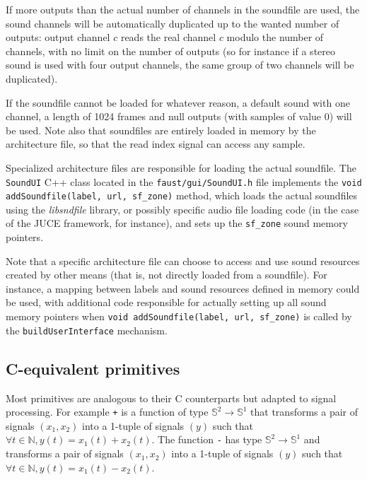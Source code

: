 If more outputs than the actual number of channels in the soundfile are used, the sound channels will be automatically duplicated up to the wanted number of outputs: output channel $c$ reads the real channel $c$ modulo the number of channels, with no limit on the number of outputs (so for instance if a stereo sound is used with four output channels, the same group of two channels will be duplicated).

If the soundfile cannot be loaded for whatever reason, a default sound with one channel, a length of 1024 frames and null outputs (with samples of value 0) will be used. Note also that soundfiles are entirely loaded in memory by the architecture file, so that the read index signal can access any sample.

Specialized architecture files are responsible for loading the actual soundfile. The \lstinline'SoundUI' C++ class located in the \lstinline'faust/gui/SoundUI.h' file implements the \lstinline'void addSoundfile(label, url, sf_zone)' method, which loads the actual soundfiles using the {\it libsndfile} library, or possibly specific audio file loading code (in the case of the JUCE framework, for instance), and sets up the \lstinline'sf_zone' sound memory pointers.

Note that a specific architecture file can choose to access and use sound resources created by other means (that is, not directly loaded from a soundfile). For instance, a mapping between labels and sound resources defined in memory could be used, with additional code responsible for actually setting up all sound memory pointers when \lstinline'void addSoundfile(label, url, sf_zone)' is called by the \lstinline'buildUserInterface' mechanism.

\subsection{C-equivalent primitives}

Most \faust primitives are analogous to their C counterparts but adapted to signal processing.
For example \lstinline|+| is a function of type $\mathbb{S}^{2}\rightarrow\mathbb{S}^{1}$ that transforms a pair of signals $(x_1,x_2)$ into a 1-tuple of signals $(y)$ such that $\forall t\in\mathbb{N}, y(t)=x_{1}(t)+x_{2}(t)$. The function \lstinline|-| has type $\mathbb{S}^{2}\rightarrow\mathbb{S}^{1}$ and transforms a pair of signals $(x_1,x_2)$ into a 1-tuple of signals $(y)$ such that $\forall t\in\mathbb{N}, y(t)=x_{1}(t)-x_{2}(t)$.

